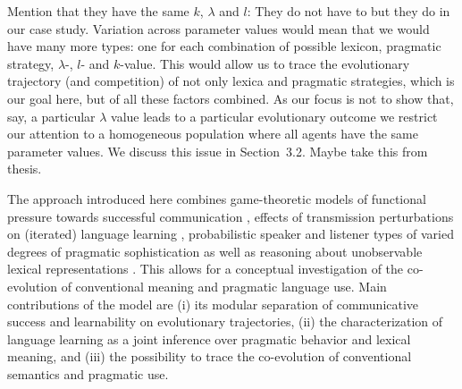 \documentclass[a4paper, 11pt]{article}
\theoremstyle{Satz}
\newcommand{\hl}[1]{\textcolor[rgb]{.8,.33,.0}{#1}}%
\begin{document}
\hl{Mention that they have the same $k$, $\lambda$ and $l$: They do not have to but they do in our case study. Variation across parameter values would mean that we would have many more types: one for each combination of possible lexicon, pragmatic strategy, $\lambda$-, $l$- and $k$-value. This would allow us to trace the evolutionary trajectory (and competition) of not only lexica and pragmatic strategies, which is our goal here, but of all these factors combined. As our focus is not to show that, say, a particular $\lambda$ value leads to a particular evolutionary outcome we restrict our attention to a homogeneous population where all agents have the same parameter values. We discuss this issue in Section~3.2. Maybe take this from thesis.}


The approach introduced here combines game-theoretic models of functional pressure towards
successful communication \citep{nowak+krakauer:1999}, effects of transmission perturbations on
(iterated) language learning \citep{griffiths+kalish:2007}, probabilistic speaker and listener
types of varied degrees of pragmatic sophistication \citep{frank+goodman:2012,
  franke+jaeger:2014} as well as reasoning about unobservable lexical representations
\citep{bergen+etal:2012,bergen+etal:2016}. This allows for a conceptual investigation of the
co-evolution of conventional meaning and pragmatic language use. Main contributions of the
model are (i) its modular separation of communicative success and learnability on evolutionary
trajectories, (ii) the characterization of language learning as a joint inference over
pragmatic behavior and lexical meaning, and (iii) the possibility to trace the co-evolution of
conventional semantics and pragmatic use.
\end{document}
